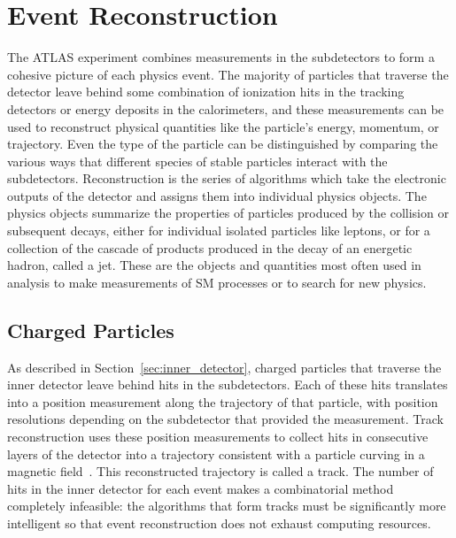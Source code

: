 \chapter{Event Reconstruction}

\label{ch:reconstruction}

The ATLAS experiment combines measurements in the subdetectors to form a cohesive picture of each physics event. 
The majority of particles that traverse the detector leave behind some combination of ionization hits in the tracking detectors or energy deposits in the calorimeters, and these measurements can be used to reconstruct physical quantities like the particle's energy, momentum, or trajectory.
Even the type of the particle can be distinguished by comparing the various ways that different species of stable particles interact with the subdetectors.
Reconstruction is the series of algorithms which take the electronic outputs of the detector and assigns them into individual physics objects.
The physics objects summarize the properties of particles produced by the collision or subsequent decays, either for individual isolated particles like leptons, or for a collection of the cascade of products produced in the decay of an energetic hadron, called a jet. 
These are the objects and quantities most often used in analysis to make measurements of \ac{SM} processes or to search for new physics.


\section{Charged Particles}
\label{sec:tracks}

As described in Section~\ref{sec:inner_detector}, charged particles that traverse the inner detector leave behind hits in the subdetectors.
Each of these hits translates into a position measurement along the trajectory of that particle, with position resolutions depending on the subdetector that provided the measurement. 
Track reconstruction uses these position measurements to collect hits in consecutive layers of the detector into a trajectory consistent with a particle curving in a magnetic field~\cite{newt, tracking_performance}.
This reconstructed trajectory is called a track.
The number of hits in the inner detector for each event makes a combinatorial method completely infeasible: the algorithms that form tracks must be significantly more intelligent so that event reconstruction does not exhaust computing resources.

